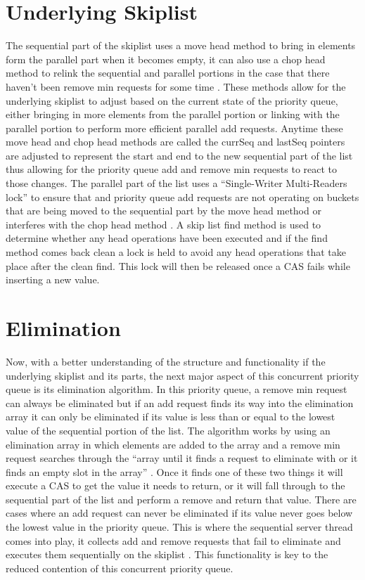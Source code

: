 \documentclass[10pt]{asme2ej}
\begin{document}
\section{Underlying Skiplist}
The sequential part of the skiplist uses a move head method to bring in elements form the parallel part when it becomes empty, it can also use a chop head method to relink the sequential and parallel portions in the case that there haven’t been remove min requests for some time \cite{latex}. These methods allow for the underlying skiplist to adjust based on the current state of the priority queue, either bringing in more elements from the parallel portion or linking with the parallel portion to perform more efficient parallel add requests. Anytime these move head and chop head methods are called the currSeq and lastSeq pointers are adjusted to represent the start and end to the new sequential part of the list thus allowing for the priority queue add and remove min requests to react to those changes. The parallel part of the list uses a “Single-Writer Multi-Readers lock” to ensure that and priority queue add requests are not operating on buckets that are being moved to the sequential part by the move head method or interferes with the chop head method \cite{latex}. A skip list find method is used to determine whether any head operations have been executed and if the find method comes back clean a lock \cite{lock} is held to avoid any head operations that take place after the clean find. This lock will then be released once a CAS fails while inserting a new value.
\section{Elimination}
Now, with a better understanding of the structure and functionality if the underlying skiplist and its parts, the next major aspect of this concurrent priority queue is its elimination algorithm. In this priority queue, a remove min request can always be eliminated but if an add request finds its way into the elimination array it can only be eliminated if its value is less than or equal to the lowest value of the sequential portion of the list. The algorithm works by using an elimination array in which elements are added to the array and a remove min request searches through the “array until it finds a request to eliminate with or it finds an empty slot in the array” \cite{latex}. Once it finds one of these two things it will execute a CAS to get the value it needs to return, or it will fall through to the sequential part of the list and perform a remove and return that value. There are cases where an add request can never be eliminated if its value never goes below the lowest value in the priority queue. This is where the sequential server thread comes into play, it collects add and remove requests that fail to eliminate and executes them sequentially on the skiplist \cite{latex}. This functionality is key to the reduced contention of this concurrent priority queue.
\end{document}
